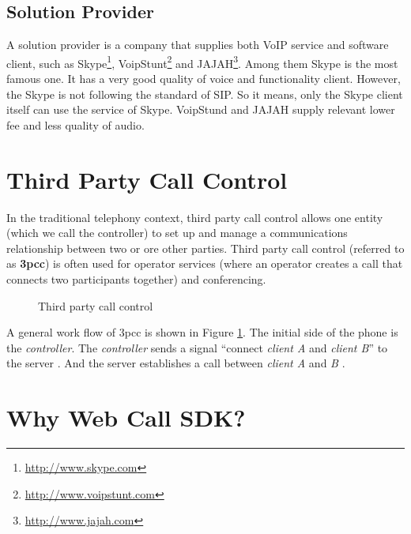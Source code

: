 \subsection{Solution Provider}
\label{sec:BackgroundStudy:VoIPMarket:SolutionProvider}

A solution provider is a company that supplies both VoIP service and software client, such as \textsf{Skype}\texttrademark{}\footnote{\url{http://www.skype.com}}, \textsf{VoipStunt}\footnote{\url{http://www.voipstunt.com}} and JAJAH\footnote{\url{http://www.jajah.com}}.  Among them \textsf{Skype} is the most famous one. It has a very good quality of voice and functionality client. However, the \textsf{Skype} is not following the standard of SIP. So it means, only the \textsf{Skype} client itself can use the service of \textsf{Skype}. \textsf{VoipStund} and \textsf{JAJAH} supply relevant lower fee and less quality of audio.


\section{Third Party Call Control}
\label{sec:BackgroundStudy:ThirdPartyCallControl}

In the traditional telephony context, third party call control allows one entity (which we call the controller) to set up and manage a communications relationship between two or ore other parties.  Third party call control (referred to as \textbf{3pcc}\label{sym:3pcc}) is often used for operator services (where an operator creates a call that connects two participants together) and conferencing.\cite{RFC3725}

\begin{figure}[!hbtp]
\centering
{}
\caption{Third party call control}
\label{fig:ThirdPartyCallControl}
\end{figure}

A general work flow of 3pcc is shown in Figure \ref{fig:ThirdPartyCallControl}. The initial side of the phone is the \textit{controller}. The \textit{controller} sends a signal ``connect \textit{client \nolinebreak A} and \textit{client \nolinebreak B}'' to the server \hyperref[fig:ThirdPartyCallControl]{}. And the server establishes a call between \textit{client A} and \textit{B} \hyperref[fig:ThirdPartyCallControl]{}.


\section{Why Web Call SDK?}
\label{sec:BackgroundStudy:WhyWebCallSDK}

